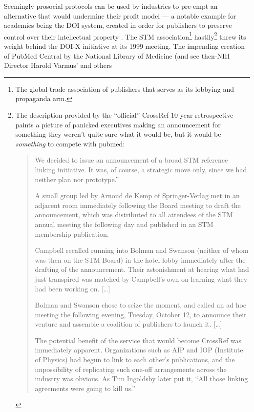 Seemingly prosocial protocols can be used by industries to pre-empt an
alternative that would undermine their profit model --- a notable
example for academics being the DOI system, created in order for
publishers to preserve control over their intellectual property \citep{rosenblattDigitalObjectIdentifier1997} . The STM
association\footnote{The global trade association of publishers that
  serves as its lobbying and propaganda arm.} hastily\footnote{The
  description provided by the ``official'' CrossRef 10 year
  retrospective paints a picture of panicked executives making an
  announcement for something they weren't quite sure what it would be,
  but it would be \emph{something} to compete with pubmed:

  \begin{quote}
  We decided to issue an announcement of a broad STM reference linking
  initiative. It was, of course, a strategic move only, since we had
  neither plan nor prototype.''

  A small group led by Arnoud de Kemp of Springer-Verlag met in an
  adjacent room immediately following the Board meeting to draft the
  announcement, which was distributed to all attendees of the STM annual
  meeting the following day and published in an STM membership
  publication.

  Campbell recalled running into Bolman and Swanson (neither of whom was
  then on the STM Board) in the hotel lobby immediately after the
  drafting of the announcement. Their astonishment at hearing what had
  just transpired was matched by Campbell's own on learning what they
  had been working on. {[}\ldots{]}

  Bolman and Swanson chose to seize the moment, and called an ad hoc
  meeting the following evening, Tuesday, October 12, to announce their
  venture and assemble a coalition of publishers to launch it.
  {[}\ldots{]}

  The potential benefit of the service that would become CrossRef was
  immediately apparent. Organizations such as AIP and IOP (Institute of
  Physics) had begun to link to each other's publications, and the
  impossibility of replicating such one-off arrangements across the
  industry was obvious. As Tim Ingoldsby later put it, ``All those
  linking agreements were going to kill us.'' \citep{crossrefFormationCrossRefShort2009} 
  \end{quote}} threw its weight behind the DOI-X initiative at its 1999
meeting. The impending creation of PubMed Central by the National
Library of Medicine (and see then-NIH Director Harold Varmus' and others
